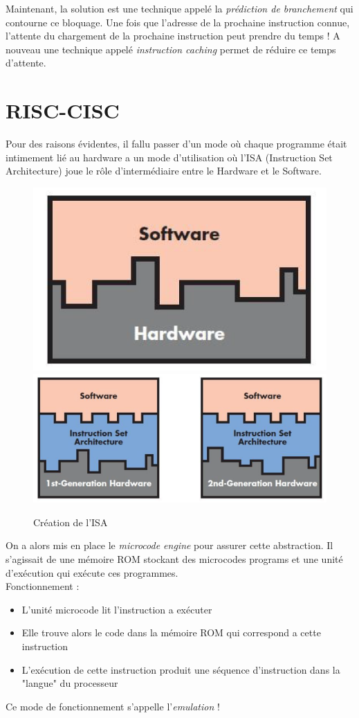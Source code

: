 \documentclass[a4paper]{article}
\begin{document}
    Maintenant, la solution est une technique appelé la \emph{prédiction de branchement} qui contourne ce bloquage. 
    Une fois que l'adresse de la prochaine instruction connue, l'attente du chargement de la prochaine instruction peut prendre du temps ! 
    A nouveau une technique appelé \emph{instruction caching} permet de réduire ce temps d'attente.










  \section{RISC-CISC}
  Pour des raisons évidentes, il fallu passer d'un mode où chaque programme était intimement lié au hardware a un mode d'utilisation où l'ISA (Instruction Set Architecture) joue le
  rôle d'intermédiaire entre le Hardware et le Software.

  \begin{figure}[H]
    \centering
    \includegraphics[width = 0.3 \textwidth]{images/7.PNG}
    \includegraphics[width = 0.4 \textwidth]{images/8.PNG}
    \caption{Création de l'ISA}
  \end{figure}

  On a alors mis en place le \emph{microcode engine} pour assurer cette abstraction. Il s'agissait de une mémoire ROM stockant des microcodes programs et une unité d’exécution 
  qui exécute ces programmes.\\[0.2cm]
  Fonctionnement :
  \begin{itemize}
    \item L'unité microcode lit l'instruction a exécuter
    \item Elle trouve alors le code dans la mémoire ROM qui correspond a cette instruction
    \item L'exécution de cette instruction produit une séquence d'instruction dans la "langue" du processeur
  \end{itemize}
  Ce mode de fonctionnement s'appelle l'\emph{emulation} !
\end{document}
